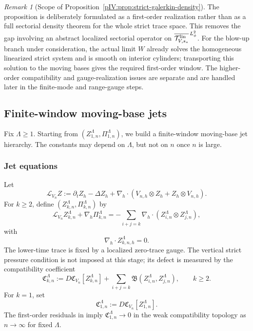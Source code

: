 \documentclass[11pt]{article}
\numberwithin{equation}{section}
\theoremstyle{plain}
\theoremstyle{definition}
\theoremstyle{remark}
\newtheorem{remark}{Remark}[section]
\newcommand{\nabh}{\nabla_h}
\newcommand{\divh}{\nabla_h\!\cdot}
\newcommand{\Tlin}{\mathcal T^{\rm lin}}
\newcommand{\calB}{\mathfrak B}
\newcommand{\calC}{\mathfrak C}
\begin{document}
\begin{remark}[Scope of Proposition~\ref{pIV:prop:strict-galerkin-density}]
The proposition is deliberately formulated as a first-order realization rather than
as a full sectorial density theorem for the whole strict trace space.  This removes
the gap involving an abstract localized sectorial operator on
\(\overline{\Tlin_{V,s_*}}^{\,L^2_\phi}\).  For the blow-up branch under consideration,
the actual limit \(W\) already solves the homogeneous linearized strict system and is
smooth on interior cylinders; transporting this solution to the moving bases gives the
required first-order window.  The higher-order compatibility and gauge-realization
issues are separate and are handled later in the finite-mode and range-gauge steps.
\end{remark}


\subsection{Finite-window moving-base jets}\label{pIV:sec:jets}

Fix \(\Lambda\ge1\).  Starting from \((Z_{1,n}^\Lambda,\Pi_{1,n}^\Lambda)\), we build
a finite-window moving-base jet hierarchy.  The constants may depend on \(\Lambda\),
but not on \(n\) once \(n\) is large.

\subsubsection{Jet equations}

Let
\begin{equation}\label{pIV:eq:Lvn}
        \mathcal L_{V_n}Z
        :=\partial_t Z_h-\Delta Z_h
        +\nabh\cdot(V_{n,h}\otimes Z_h+Z_h\otimes V_{n,h}).
\end{equation}
For \(k\ge2\), define \((Z_{k,n}^\Lambda,\Pi_{k,n}^\Lambda)\) by
\begin{equation}\label{pIV:eq:jet-equation}
        \mathcal L_{V_n}Z_{k,n}^\Lambda+
        \nabh\Pi_{k,n}^\Lambda
        =-
        \sum_{i+j=k}\nabh\cdot
        (Z_{i,n}^\Lambda\otimes Z_{j,n}^\Lambda),
\end{equation}
with
\begin{equation}\label{pIV:eq:jet-div}
        \divh Z_{k,n,h}^\Lambda=0.
\end{equation}
The lower-time trace is fixed by a localized zero-trace gauge.  The vertical strict
pressure condition is not imposed at this stage; its defect is measured by the
compatibility coefficient
\begin{equation}\label{pIV:eq:compat-coeff}
        \calC_{k,n}^\Lambda
        :=D\calC_{V_n}[Z_{k,n}^\Lambda]
        +\sum_{i+j=k}\calB(Z_{i,n}^\Lambda,Z_{j,n}^\Lambda),
        \qquad k\ge2.
\end{equation}
For \(k=1\), set
\begin{equation}\label{pIV:eq:first-compat}
        \calC_{1,n}^\Lambda:=D\calC_{V_n}[Z_{1,n}^\Lambda].
\end{equation}
The first-order residuals in  imply
\(\calC_{1,n}^\Lambda\to0\) in the weak compatibility topology as \(n\to\infty\) for
fixed \(\Lambda\).
\end{document}
